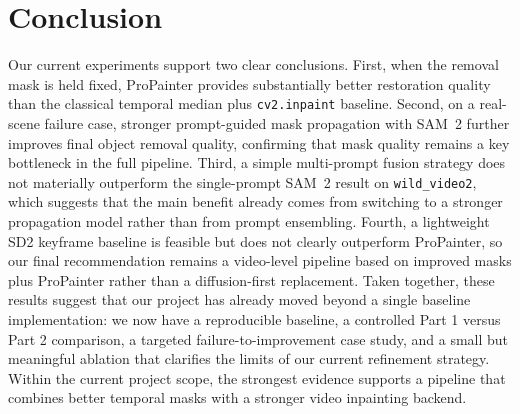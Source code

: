 \documentclass[10pt,twocolumn,letterpaper]{article}
\begin{document}
\section{Conclusion}
Our current experiments support two clear conclusions.
First, when the removal mask is held fixed, ProPainter provides substantially better restoration quality than the classical temporal median plus \texttt{cv2.inpaint} baseline.
Second, on a real-scene failure case, stronger prompt-guided mask propagation with SAM~2 further improves final object removal quality, confirming that mask quality remains a key bottleneck in the full pipeline.
Third, a simple multi-prompt fusion strategy does not materially outperform the single-prompt SAM~2 result on \texttt{wild\_video2}, which suggests that the main benefit already comes from switching to a stronger propagation model rather than from prompt ensembling.
Fourth, a lightweight SD2 keyframe baseline is feasible but does not clearly outperform ProPainter, so our final recommendation remains a video-level pipeline based on improved masks plus ProPainter rather than a diffusion-first replacement.
Taken together, these results suggest that our project has already moved beyond a single baseline implementation: we now have a reproducible baseline, a controlled Part 1 versus Part 2 comparison, a targeted failure-to-improvement case study, and a small but meaningful ablation that clarifies the limits of our current refinement strategy.
Within the current project scope, the strongest evidence supports a pipeline that combines better temporal masks with a stronger video inpainting backend.



\end{document}
